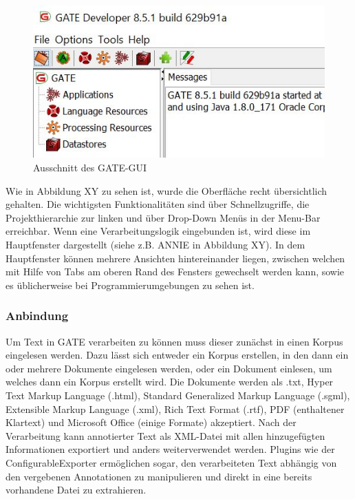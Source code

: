 \documentclass[12pt]{report}
\begin{document}
\begin{figure}[h!]
\begin{center}
\includegraphics[scale=0.8]{GATE_Bilder/GUI-Ausschnitt.jpg}
\caption{Ausschnitt des GATE-GUI}
\end{center}
\end{figure}

Wie in Abbildung XY zu sehen ist, wurde die Oberfläche recht übersichtlich gehalten. Die wichtigsten Funktionalitäten sind über Schnellzugriffe, die Projekthierarchie zur linken und über Drop-Down Menüs in der Menu-Bar erreichbar. Wenn eine Verarbeitungslogik eingebunden ist, wird diese im Hauptfenster dargestellt (siehe z.B. ANNIE in Abbildung XY). In dem Hauptfenster können mehrere Ansichten hintereinander liegen, zwischen welchen mit Hilfe von Tabs am oberen Rand des Fensters gewechselt werden kann, sowie es üblicherweise bei Programmierumgebungen zu sehen ist. 

\subsubsection{Anbindung}

Um Text in GATE verarbeiten zu können muss dieser zunächst in einen Korpus eingelesen werden. Dazu lässt sich entweder ein Korpus erstellen, in den dann ein oder mehrere Dokumente eingelesen werden, oder ein Dokument einlesen, um welches dann ein Korpus erstellt wird. Die Dokumente werden als .txt, Hyper Text Markup Language (.html), Standard Generalized Markup Language (.sgml), Extensible Markup Language (.xml), Rich Text Format (.rtf), PDF (enthaltener Klartext) und Microsoft Office (einige Formate) akzeptiert.
Nach der Verarbeitung kann annotierter Text als XML-Datei mit allen hinzugefügten Informationen exportiert und anders weiterverwendet werden. Plugins wie der ConfigurableExporter ermöglichen sogar, den verarbeiteten Text abhängig von den vergebenen Annotationen zu manipulieren und direkt in eine bereits vorhandene Datei zu extrahieren. 
\end{document}
